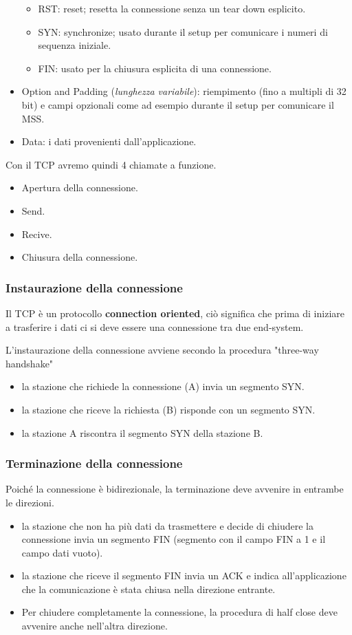 \documentclass[oneside,a4paper,11pt]{book}
\theoremstyle{italicstyle}
\theoremstyle{normStyle}
\begin{document}
\begin{itemize}
\begin{itemize}
    \item RST: reset; resetta la connessione senza un tear down esplicito.
    \item SYN: synchronize; usato durante il setup per comunicare i numeri di sequenza iniziale.
    \item FIN: usato per la chiusura esplicita di una connessione.
  \end{itemize}
  \item Option and Padding (\textit{lunghezza variabile}):  riempimento (fino a multipli di 32 bit) e campi 
  opzionali come ad esempio durante il setup per comunicare il MSS.
  \item Data: i dati provenienti dall’applicazione.
\end{itemize}
Con il TCP avremo quindi 4 chiamate a funzione.
\begin{itemize}
  \item Apertura della connessione.
  \item Send.
  \item Recive.
  \item Chiusura della connessione.
\end{itemize}
\subsubsection{Instaurazione della connessione}
Il TCP è un protocollo \textbf{connection oriented}, ciò significa 
che prima di iniziare a trasferire i dati ci si deve essere 
una connessione tra due end-system.

L'instaurazione della connessione avviene secondo la procedura 
"three-way handshake"
\begin{itemize}
  \item la stazione che richiede la connessione (A) invia un segmento SYN.
  \item la stazione che riceve la richiesta (B) risponde con un segmento
  SYN.
  \item la stazione A riscontra il segmento SYN della stazione B.
\end{itemize}
\subsubsection{Terminazione della connessione}
Poiché la connessione è bidirezionale, la terminazione deve avvenire in entrambe le direzioni.
\begin{itemize}
  \item la stazione che non ha più dati da trasmettere e decide
  di chiudere la connessione invia un segmento FIN (segmento con il campo FIN a 1 e il campo dati vuoto).
  \item la stazione che riceve il segmento FIN invia un ACK e indica all'applicazione che la comunicazione 
  è stata chiusa nella direzione entrante.
  \item Per chiudere completamente la connessione, la procedura 
  di half close deve avvenire anche nell'altra direzione.
\end{itemize}
\end{document}
